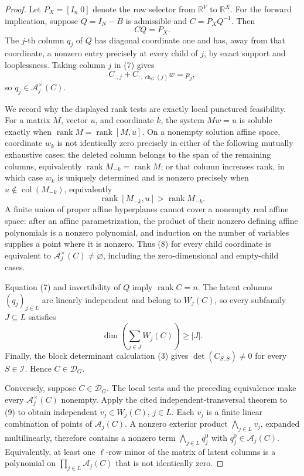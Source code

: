 \documentclass{article}
\begin{document}
\begin{proof}
Let \(P_X=[I_n\;0]\) denote the row selector from \(\mathbb R^V\) to \(\mathbb R^X\).  For the forward implication, suppose \(Q=I_N-B\) is admissible and \(C=P_XQ^{-1}\).  Then
\[
CQ=P_X.                                                                  \tag{7}
\]
The \(j\)-th column \(q_j\) of \(Q\) has diagonal coordinate one and has, away from that coordinate, a nonzero entry precisely at every child of \(j\), by exact support and looplessness.  Taking column \(j\) in (7) gives
\[
C_{:,j}+C_{:,\operatorname{ch}_G(j)}w=p_j,
\]
so \(q_j\in\mathcal A_j^\times(C)\).

We record why the displayed rank tests are exactly local punctured feasibility.  For a matrix \(M\), vector \(u\), and coordinate \(k\), the system \(Mw=u\) is soluble exactly when \(\operatorname{rank}M=\operatorname{rank}[M,u]\).  On a nonempty solution affine space, coordinate \(w_k\) is not identically zero precisely in either of the following mutually exhaustive cases: the deleted column belongs to the span of the remaining columns, equivalently \(\operatorname{rank}M_{-k}=\operatorname{rank}M\); or that column increases rank, in which case \(w_k\) is uniquely determined and is nonzero precisely when \(u\notin\operatorname{col}(M_{-k})\), equivalently
\[
\operatorname{rank}[M_{-k},u]>\operatorname{rank}M_{-k}.                 \tag{8}
\]
A finite union of proper affine hyperplanes cannot cover a nonempty real affine space: after an affine parametrization, the product of their nonzero defining affine polynomials is a nonzero polynomial, and induction on the number of variables supplies a point where it is nonzero.  Thus (8) for every child coordinate is equivalent to \(\mathcal A_j^\times(C)\neq\varnothing\), including the zero-dimensional and empty-child cases.

Equation (7) and invertibility of \(Q\) imply \(\operatorname{rank}C=n\).  The latent columns \((q_j)_{j\in L}\) are linearly independent and belong to \(W_j(C)\), so every subfamily \(J\subseteq L\) satisfies
\[
\dim\left(\sum_{j\in J}W_j(C)\right)\geq |J|.                           \tag{9}
\]
Finally, the block determinant calculation (3) gives \(\det(C_{S,S})\neq0\) for every \(S\in\mathcal I\).  Hence \(C\in\mathcal D_G\).

Conversely, suppose \(C\in\mathcal D_G\).  The local tests and the preceding equivalence make every \(\mathcal A_j^\times(C)\) nonempty.  Apply the cited independent-transversal theorem to (9) to obtain independent \(v_j\in W_j(C)\), \(j\in L\).  Each \(v_j\) is a finite linear combination of points of \(\mathcal A_j(C)\).  A nonzero exterior product \(\bigwedge_{j\in L}v_j\), expanded multilinearly, therefore contains a nonzero term \(\bigwedge_{j\in L}q_j^0\) with \(q_j^0\in\mathcal A_j(C)\).  Equivalently, at least one \(\ell\)-row minor of the matrix of latent columns is a polynomial on \(\prod_{j\in L}\mathcal A_j(C)\) that is not identically zero.


\end{proof}
\end{document}
